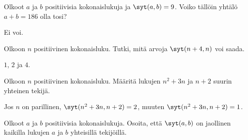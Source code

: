 \begin{tehtava}
    Olkoot $a$ ja $b$ positiivisia kokonaislukuja ja $\syt(a, b)=9$. Voiko tällöin yhtälö $a + b = 186$ olla tosi?
    
    \begin{vastaus}
        Ei voi.
    \end{vastaus}
    
\end{tehtava}

\begin{tehtava}
    Olkoon $n$ positiivinen kokonaisluku. Tutki, mitä arvoja $\syt(n+4, n)$ voi saada.
    
    \begin{vastaus}
        $1$, $2$ ja $4$.
    \end{vastaus}
    
\end{tehtava}

\begin{tehtava}
    Olkoon $n$ positiivinen kokonaisluku. Määritä lukujen $n^2 + 3n$ ja $n + 2$ suurin yhteinen tekijä.
    
    \begin{vastaus}
        Jos $n$ on parillinen, $\syt(n^2 + 3n, n + 2) = 2$, muuten $\syt(n^2 + 3n, n + 2) = 1$.
    \end{vastaus}
    
\end{tehtava}

\begin{tehtava}
    Olkoot $a$ ja $b$ positiivisia kokonaislukuja. Osoita, että $\syt(a, b)$ on jaollinen kaikilla lukujen $a$ ja $b$ yhteisillä tekijöillä.
\end{tehtava}
